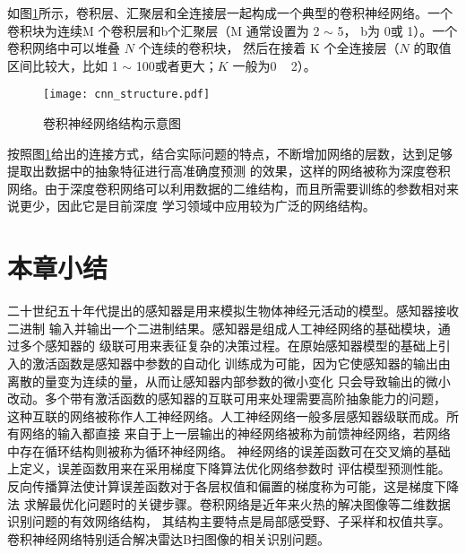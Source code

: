 如图\ref{cnn_structure}所示，卷积层、汇聚层和全连接层一起构成一个典型的卷积神经网络。一个卷积块为连续M 个卷积层和b个汇聚层（M
通常设置为 2 $\sim$ 5， b为 0或 1）。一个卷积网络中可以堆叠 $N$ 个连续的卷积块，
然后在接着 K 个全连接层（$N$ 的取值区间比较大，比如 1 $\sim$ 100或者更大；$K$
一般为0 ~ 2）。
\begin{figure}[h]
	\texttt{[image: cnn\_structure.pdf]}
	\caption{卷积神经网络结构示意图}
	\label{cnn_structure}
\end{figure}

按照图\ref{cnn_structure}给出的连接方式，结合实际问题的特点，不断增加网络的层数，达到足够提取出数据中的抽象特征进行高准确度预测
的效果，这样的网络被称为深度卷积网络。由于深度卷积网络可以利用数据的二维结构，而且所需要训练的参数相对来说更少，因此它是目前深度
学习领域中应用较为广泛的网络结构。

\section{本章小结}
二十世纪五十年代提出的感知器是用来模拟生物体神经元活动的模型。感知器接收二进制
输入并输出一个二进制结果。感知器是组成人工神经网络的基础模块，通过多个感知器的
级联可用来表征复杂的决策过程。在原始感知器模型的基础上引入的激活函数是感知器中参数的自动化
训练成为可能，因为它使感知器的输出由离散的量变为连续的量，从而让感知器内部参数的微小变化
只会导致输出的微小改动。多个带有激活函数的感知器的互联可用来处理需要高阶抽象能力的问题，
这种互联的网络被称作人工神经网络。人工神经网络一般多层感知器级联而成。所有网络的输入都直接
来自于上一层输出的神经网络被称为前馈神经网络，若网络中存在循环结构则被称为循环神经网络。
神经网络的误差函数可在交叉熵的基础上定义，误差函数用来在采用梯度下降算法优化网络参数时
评估模型预测性能。反向传播算法使计算误差函数对于各层权值和偏置的梯度称为可能，这是梯度下降法
求解最优化问题时的关键步骤。卷积网络是近年来火热的解决图像等二维数据识别问题的有效网络结构，
其结构主要特点是局部感受野、子采样和权值共享。卷积神经网络特别适合解决雷达B扫图像的相关识别问题。
